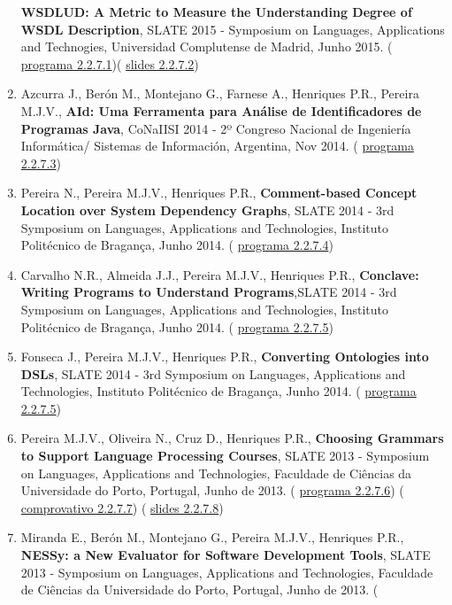 \documentclass[11pt]{article}
\begin{document}
\begin{enumerate}
{{\bf{ WSDLUD: A Metric to Measure the Understanding Degree of WSDL Description}}, SLATE 2015 - Symposium on Languages, Applications and Technogies, Universidad Complutense de Madrid, Junho 2015. (
\href{run:ComunicacoesOrais/programas/SLATE2015prog.pdf}{programa 2.2.7.1})(
\href{run:ComunicacoesOrais/Slate2015apres.pdf}{slides 2.2.7.2})}
\item{Azcurra J., Berón M., Montejano G., Farnese A., Henriques P.R., Pereira M.J.V., {
\bf{ AId: Uma Ferramenta para Análise de Identificadores de Programas Java}}, CoNaIISI 2014 - 2º Congreso Nacional de Ingeniería Informática/ Sistemas de Información, Argentina, Nov 2014. (
\href{run:ComunicacoesOrais/programas/CoN2014prog.pdf}{programa 2.2.7.3})}
\item{Pereira N., Pereira M.J.V., Henriques P.R., {
\bf{ Comment-based Concept Location over System Dependency Graphs}}, SLATE 2014 - 3rd Symposium on Languages, Applications and Technologies, Instituto Politécnico de Bragança, Junho 2014. (
\href{run:ComunicacoesOrais/programas/SLATE2014prog.pdf}{programa 2.2.7.4})}
\item{Carvalho N.R., Almeida J.J., Pereira M.J.V., Henriques P.R., {
\bf{ Conclave: Writing Programs to Understand Programs}},SLATE 2014 - 3rd Symposium on Languages, Applications and Technologies, Instituto Politécnico de Bragança, Junho 2014. (
\href{run:ComunicacoesOrais/programas/SLATE2014prog.pdf}{programa 2.2.7.5})}
\item{Fonseca J., Pereira M.J.V., Henriques P.R., {
\bf{ Converting Ontologies into DSLs}}, SLATE 2014 - 3rd Symposium on Languages, Applications and Technologies, Instituto Politécnico de Bragança, Junho 2014. (
\href{run:ComunicacoesOrais/programas/SLATE2014prog.pdf}{programa 2.2.7.5})}
\item{Pereira M.J.V., Oliveira N., Cruz D., Henriques P.R., {
\bf{ Choosing Grammars to Support Language Processing Courses}}, SLATE 2013 - Symposium on Languages, Applications and Technologies, Faculdade de Ciências da Universidade do Porto, Portugal, Junho de 2013. (
\href{run:ComunicacoesOrais/programas/SLATE2013prog.pdf}{programa 2.2.7.6}) (
\href{run:ComunicacoesOrais/programas/SLATE2013ChooComp.pdf}{comprovativo 2.2.7.7}) (
\href{run:ComunicacoesOrais/Slate13apres.pdf}{slides 2.2.7.8})}
\item{Miranda E., Berón M., Montejano G., Pereira M.J.V., Henriques P.R., {
\bf{ NESSy: a New Evaluator for Software Development Tools}}, SLATE 2013 - Symposium on Languages, Applications and Technologies, Faculdade de Ciências da Universidade do Porto, Portugal, Junho de 2013. (
}
\end{enumerate}
\end{document}
